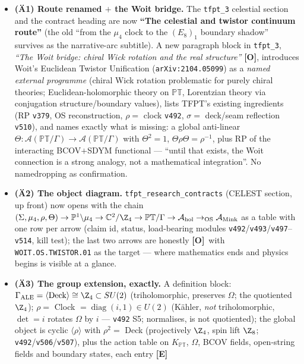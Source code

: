\documentclass[11pt]{article}
\providecommand{\mE}{\textbf{[E]}}\providecommand{\mC}{\textbf{[C]}}
\providecommand{\mO}{\textbf{[O]}}\providecommand{\mX}{\textbf{[X]}}
\begin{document}
\begin{itemize}[leftmargin=1.5em]
\item \textbf{(\"A1) Route renamed $+$ the Woit bridge.} The \texttt{tfpt\_3} celestial section and the
contract heading are now \textbf{``The celestial and twistor continuum route''} (the old ``from the
$\mu_4$ clock to the $(E_8)_1$ boundary shadow'' survives as the narrative-arc subtitle). A new
paragraph block in \texttt{tfpt\_3}, \emph{``The Woit bridge: chiral Wick rotation and the real
structure''} \mO, introduces Woit's Euclidean Twistor Unification (\texttt{arXiv:2104.05099}) as a
\emph{named external programme} (chiral Wick rotation problematic for purely chiral theories;
Euclidean-holomorphic theory on $\mathbb{PT}$, Lorentzian theory via conjugation
structure/boundary values), lists TFPT's existing ingredients (RP \texttt{v379}, OS reconstruction,
$\rho=$ clock \texttt{v492}, $\sigma=$ deck/seam reflection \texttt{v510}), and names exactly what
is missing: a global anti-linear $\Theta:\mathcal A(\mathbb{PT}/\Gamma)\to\mathcal
A(\mathbb{PT}/\Gamma)$ with $\Theta^2=1$, $\Theta\rho\Theta=\rho^{-1}$, plus RP of the interacting
BCOV$+$SDYM functional --- ``until that exists, the Woit connection is a strong analogy, not a
mathematical integration''. No namedropping as confirmation.
\item \textbf{(\"A2) The object diagram.} \texttt{tfpt\_research\_contracts} (CELEST section, up
front) now opens with the chain $(\Sigma,\mu_4,\rho,\Theta)\to\mathbb
P^1{\setminus}\mu_4\to\mathbb C^2/\Z_4\to\mathbb{PT}/\Gamma\to\mathcal
A_{\mathrm{hol}}\to_{\mathrm{OS}}\mathcal A_{\mathrm{Mink}}$ as a table with one row per arrow
(claim id, status, load-bearing modules \texttt{v492}/\texttt{v493}/\texttt{v497}--\texttt{v514},
kill test); the last two arrows are honestly \mO\ with \texttt{WOIT.OS.TWISTOR.01} as the target ---
where mathematics ends and physics begins is visible at a glance.
\item \textbf{(\"A3) The group extension, exactly.} A definition block:
$\Gamma_{\mathrm{ALE}}=\langle\text{Deck}\rangle\cong\Z_4\subset SU(2)$ (triholomorphic, preserves
$\Omega$; the quotiented $\Z_4$); $\rho=$ Clock $=\operatorname{diag}(i,1)\in U(2)$ (K\"ahler,
\emph{not} triholomorphic, $\det=i$ rotates $\Omega$ by $i$ --- \texttt{v492} S5; normalises, is not
quotiented); the global object is cyclic $\langle\rho\rangle$ with $\rho^2=$ Deck (projectively
$\Z_4$, spin lift $\Z_8$; \texttt{v492}/\texttt{v506}/\texttt{v507}), plus the action table on
$K_{\mathbb{PT}}$, $\Omega$, BCOV fields, open-string fields and boundary states, each entry \mE\

\end{itemize}
\end{document}
